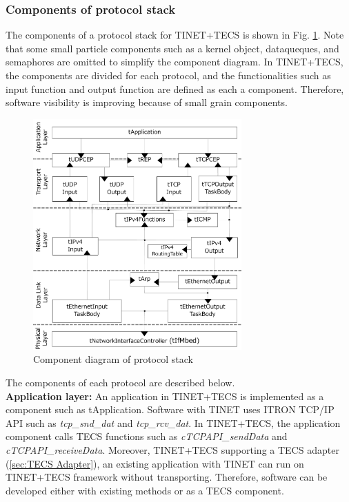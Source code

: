 \documentclass[conference]{IEEEtran/IEEEtran}
\begin{document}
\subsubsection{Components of protocol stack}

The components of a protocol stack for TINET+TECS is shown in Fig. \ref{fig:ComponentProtocolStack}.
Note that some small particle components such as a kernel object, dataqueques, and semaphores are omitted to simplify the component diagram.
In TINET+TECS, the components are divided for each protocol, and the functionalities such as input function and output function are defined as each a component.
Therefore, software visibility is improving because of small grain components.

\begin{figure}[t]
    \centering
    \includegraphics[width=8.0cm,clip]{figure/ComponentProtocolStack.pdf}
    \caption{Component diagram of protocol stack}
    \label{fig:ComponentProtocolStack}
\end{figure}

The components of each protocol are described below.\\

{\bf Application layer:}
An application in TINET+TECS is implemented as a component such as tApplication.
Software with TINET uses ITRON TCP/IP API \cite{url:ITRON_TCP/IP_API_Spec} such as {\it tcp\_snd\_dat} and {\it tcp\_rcv\_dat}.
In TINET+TECS, the application component calls TECS functions such as {\it cTCPAPI\_sendData} and {\it cTCPAPI\_receiveData}.
Moreover, TINET+TECS supporting a TECS adapter (\ref{sec:TECS Adapter}), an existing application with TINET can run on TINET+TECS framework without transporting.
Therefore, software can be developed either with existing methods or as a TECS component.
\end{document}
